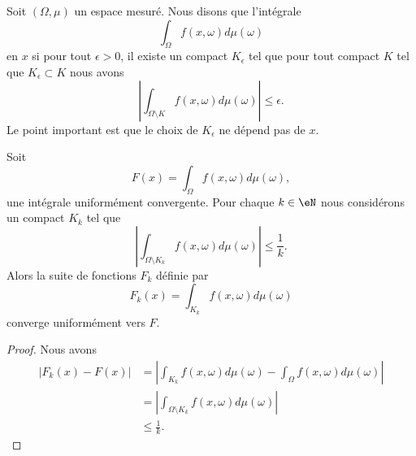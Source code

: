 \begin{definition}      \label{DEFooSHWAooWtswtp}
    Soit \( (\Omega,\mu)\) un espace mesuré. Nous disons que l'intégrale
    \begin{equation}
        \int_{\Omega}f(x,\omega)d\mu(\omega)
    \end{equation}
     en \( x\) si pour tout \( \epsilon>0\), il existe un compact \( K_{\epsilon}\) tel que pour tout compact \( K\) tel que \( K_{\epsilon}\subset K\) nous avons
    \begin{equation}
        \left| \int_{\Omega\setminus K}f(x,\omega)d\mu(\omega) \right| \leq \epsilon.
    \end{equation}
    Le point important est que le choix de \( K_{\epsilon}\) ne dépend pas de \( x\).
\end{definition}

\begin{lemma}       \label{LemOgQdpJ}
    Soit
    \begin{equation}
        F(x)=\int_{\Omega}f(x,\omega)d\mu(\omega),
    \end{equation}
    une intégrale uniformément convergente. Pour chaque \( k\in \eN\) nous considérons un compact \( K_k\) tel que
    \begin{equation}
        \left| \int_{\Omega\setminus K_k}f(x,\omega)d\mu(\omega) \right| \leq\frac{1}{ k }.
    \end{equation}
    Alors la suite de fonctions \( F_k\) définie par
    \begin{equation}
        F_k(x)=\int_{K_k}f(x,\omega)d\mu(\omega)
    \end{equation}
    converge uniformément vers \( F\).
\end{lemma}

\begin{proof}
    Nous avons
    \begin{subequations}
        \begin{align}
            \big| F_k(x)-F(x) \big|&=\left| \int_{K_k}f(x,\omega)d\mu(\omega)-\int_{\Omega}f(x,\omega)d\mu(\omega) \right| \\
            &=| \int_{\Omega\setminus K_k}f(x,\omega)d\mu(\omega) |\\
            &\leq \frac{1}{ k }.
        \end{align}
    \end{subequations}
\end{proof}

